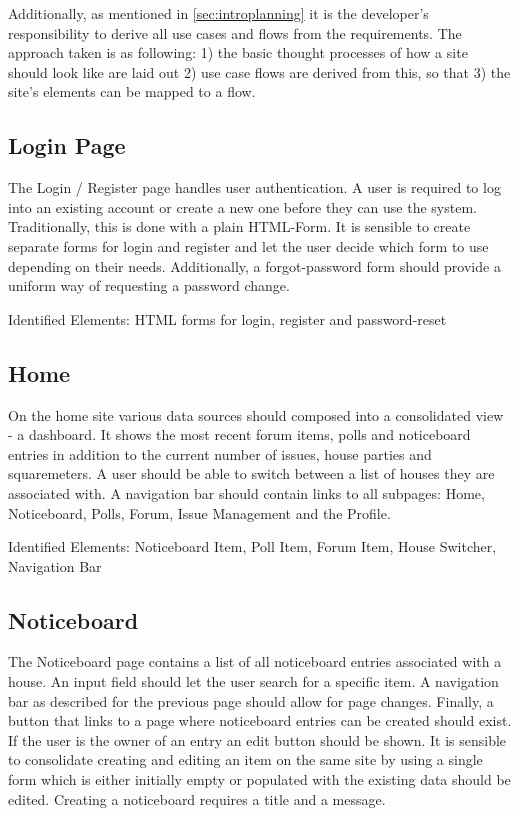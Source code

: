 Additionally, as mentioned in \autoref{sec:introplanning} it is the developer's responsibility to derive all use cases and flows from the requirements. The approach taken is as following: 1) the basic thought processes of how a site should look like are laid out 2) use case flows are derived from this, so that 3) the site's elements can be mapped to a flow.

\subsection{Login Page}
The Login / Register page handles user authentication. A user is required to log into an existing account or create a new one before they can use the system. Traditionally, this is done with a plain HTML-Form. It is sensible to create separate forms for login and register and let the user decide which form to use depending on their needs. Additionally, a forgot-password form should provide a uniform way of requesting a password change. \newline

Identified Elements: HTML forms for login, register and password-reset

\subsection{Home}
On the home site various data sources should composed into a consolidated view - a dashboard. It shows the most recent forum items, polls and noticeboard entries in addition to the current number of issues, house parties and squaremeters. A user should be able to switch between a list of houses they are associated with. A navigation bar should contain links to all subpages: Home, Noticeboard, Polls, Forum, Issue Management and the Profile. \newline

Identified Elements: Noticeboard Item, Poll Item, Forum Item, House Switcher, Navigation Bar

\subsection{Noticeboard}
The Noticeboard page contains a list of all noticeboard entries associated with a house. An input field should let the user search for a specific item. A navigation bar as described for the previous page should allow for page changes. Finally, a button that links to a page where noticeboard entries can be created should exist. If the user is the owner of an entry an edit button should be shown. It is sensible to consolidate creating and editing an item on the same site by using a single form which is either initially empty or populated with the existing data should be edited. Creating a noticeboard requires a title and a message. \newline

